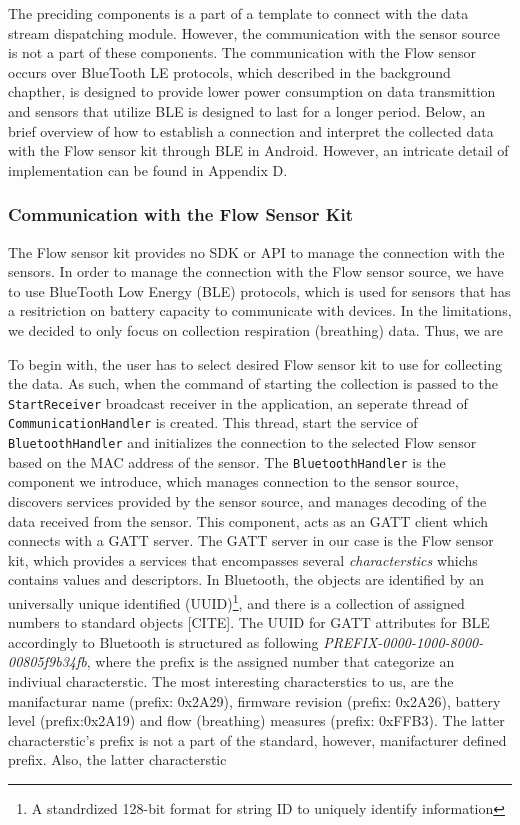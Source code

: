 The preciding components is a part of a template to connect with the data stream dispatching module. However, the communication with the sensor source is not a part of these components. The communication with the Flow sensor occurs over BlueTooth LE protocols, which described in the background chapther, is designed to provide lower power consumption on data transmittion and sensors that utilize BLE is designed to last for a longer period. Below, an brief overview of how to establish a connection and interpret the collected data with the Flow sensor kit through BLE in Android. However, an intricate detail of implementation can be found in Appendix D.


\subsubsection{Communication with the Flow Sensor Kit}
The Flow sensor kit provides no SDK or API to manage the connection with the sensors. In order to manage the connection with the Flow sensor source, we have to use BlueTooth Low Energy (BLE) protocols, which is used for sensors that has a resitriction on battery capacity to communicate with devices. In the limitations, we decided to only focus on collection respiration (breathing) data. Thus, we are 

To begin with, the user has to select desired Flow sensor kit to use for collecting the data. As such, when the command of starting the collection is passed to the \verb|StartReceiver| broadcast receiver in the application, an seperate thread of \verb|CommunicationHandler| is created. This thread, start the service of \verb|BluetoothHandler| and initializes the connection to the selected Flow sensor based on the MAC address of the sensor. The \verb|BluetoothHandler| is the component we introduce, which manages connection to the sensor source, discovers services provided by the sensor source, and manages decoding of the data received from the sensor. This component, acts as an GATT client which connects with a GATT server. The GATT server in our case is the Flow sensor kit, which provides a services that encompasses several \textit{characterstics} whichs contains values and descriptors. In Bluetooth, the objects are identified by an universally unique identified (UUID)\footnote{A standrdized 128-bit format for string ID to uniquely identify information}, and there is a collection of assigned numbers to standard objects [CITE]. The UUID for GATT attributes for BLE accordingly to Bluetooth is structured as following \textit{PREFIX-0000-1000-8000-00805f9b34fb}, where the prefix is the assigned number that categorize an indiviual characterstic. The most interesting characterstics to us, are the manifacturar name (prefix: 0x2A29), firmware revision (prefix: 0x2A26), battery level (prefix:0x2A19) and flow (breathing) measures (prefix: 0xFFB3). The latter characterstic's prefix is not a part of the standard, however, manifacturer defined prefix. Also, the latter characterstic

